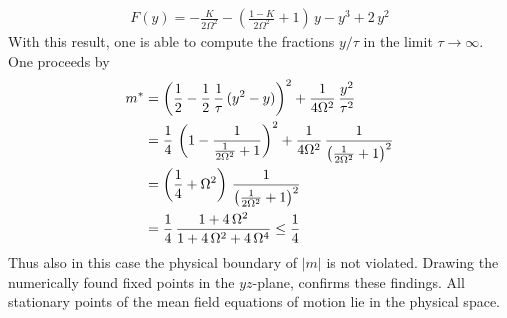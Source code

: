     \begin{align*}
        F(y)=-\frac{K}{2\Omega^2}-\left( \frac{1-K}{2\Omega^2} +1\right)\,{y}-{y}^3+2\,{y}^2
    \end{align*}
    With this result, one is able to compute the fractions $y/\tau$ in the limit $\tau\rightarrow\infty$. One proceeds by
    \begin{align*}
        m^*&=\left( \frac{1}{2}- \frac{1}{2}\,\frac{1}{\tau}\,(y^2-y) \right)^2+\frac{1}{4\Omega^2}\,\frac{y^2}{\tau^2}\\
        &=\frac{1}{4}\,\left( 1- \frac{1}{\frac{1}{2\Omega^2}+1}\right)^2+\frac{1}{4\Omega^2}\,\frac{1}{\left(\frac{1}{2\Omega^2}+1\right)^2}\\
        &=\left(\frac{1}{4}+\Omega^2\right)\,\frac{1}{\left(\frac{1}{2\Omega^2}+1\right)^2}\\
        &=\frac{1}{4}\,\frac{1+4\,\Omega^2}{1+4\,\Omega^2+4\,\Omega^4}\leq\frac{1}{4}
    \end{align*}
    Thus also in this case the physical boundary of $|m|$ is not violated. Drawing the numerically found fixed points in the $yz$-plane, confirms these findings. All stationary points of the mean field equations of motion lie in the physical space.
